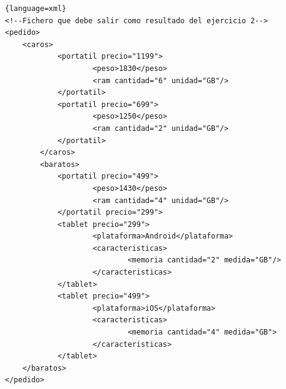 \documentclass{examen}
\begin{document}
\break

\begin{lstlisting}{language=xml}
<!--Fichero que debe salir como resultado del ejercicio 2-->
<pedido>
	<caros>        
            <portatil precio="1199">
                    <peso>1830</peso>
                    <ram cantidad="6" unidad="GB"/>
            </portatil>
            <portatil precio="699">
                    <peso>1250</peso>
                    <ram cantidad="2" unidad="GB"/>
            </portatil>
        </caros>
        <baratos>
            <portatil precio="499">
                    <peso>1430</peso>
                    <ram cantidad="4" unidad="GB"/>
            </portatil precio="299">
            <tablet precio="299">
                    <plataforma>Android</plataforma>
                    <caracteristicas>
                            <memoria cantidad="2" medida="GB"/>
                    </caracteristicas>
            </tablet>
            <tablet precio="499">
                    <plataforma>iOS</plataforma>
                    <caracteristicas>
                            <memoria cantidad="4" medida="GB">
                    </caracteristicas>
            </tablet>
    </baratos>
</pedido>

\end{lstlisting}
\end{document}
